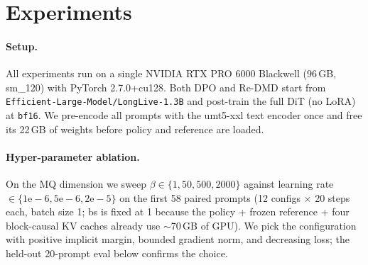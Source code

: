\documentclass{article}
\begin{document}
\section{Experiments}
\label{sec:experiments}

\paragraph{Setup.} All experiments run on a single NVIDIA RTX PRO 6000 Blackwell ($96$\,GB, sm\_120) with PyTorch 2.7.0+cu128. Both DPO and Re-DMD start from \texttt{Efficient-Large-Model/LongLive-1.3B} and post-train the full DiT (no LoRA) at \texttt{bf16}. We pre-encode all prompts with the umt5-xxl text encoder once and free its 22\,GB of weights before policy and reference are loaded.

\paragraph{Hyper-parameter ablation.} On the MQ dimension we sweep $\beta \in \{1, 50, 500, 2000\}$ against learning rate $\in \{1\mathrm{e}{-}6, 5\mathrm{e}{-}6, 2\mathrm{e}{-}5\}$ on the first 58 paired prompts (12 configs $\times$ 20 steps each, batch size 1; bs is fixed at 1 because the policy + frozen reference + four block-causal KV caches already use $\sim$70\,GB of GPU). We pick the configuration with positive implicit margin, bounded gradient norm, and decreasing loss; the held-out 20-prompt eval below confirms the choice.
\end{document}
